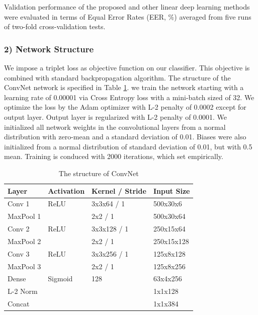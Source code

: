 \documentclass[runningheads]{llncs}
\begin{document}
Validation performance of the proposed and other linear deep learning methods were evaluated in terms of Equal Error Rates (EER, \%) averaged from five runs of two-fold cross-validation tests. 

\subsubsection{2) Network Structure}
 We impose a triplet loss as objective function on our classifier. This objective is combined with standard backpropagation algorithm.
 The structure of the ConvNet network is specified in Table \ref{tab1}. we train the network starting with a learning rate of 0.00001 via Cross Entropy loss with a mini-batch sized of 32. We optimize the loss by the Adam optimizer with L-2 penalty of 0.0002 except for output layer. Output layer is regularized with L-2 penalty of 0.0001.
 We initialized all network weights in the convolutional layers from a normal distribution with zero-mean and a standard deviation of 0.01. Biases were also initialized from a normal distribution of standard deviation of 0.01, but with 0.5 mean.
 Training is conduced with 2000 iterations, which set empirically.
 
 \begin{table}[]
    \caption{The structure of ConvNet}\label{tab1}
    \centering
    \begin{tabular}{|l|l|l|l|}
    \hline
    Layer     & Activation & Kernel / Stride & Input Size \\ \hline
    Conv 1    & ReLU       & 3x3x64 / 1      & 500x30x6   \\
    MaxPool 1 &            & 2x2 / 1         & 500x30x64  \\
    Conv 2    & ReLU       & 3x3x128 / 1     & 250x15x64 \\
    MaxPool 2 &            & 2x2 / 1         & 250x15x128 \\
    Conv 3    & ReLU       & 3x3x256 / 1     & 125x8x128  \\
    MaxPool 3 &            & 2x2 / 1         & 125x8x256  \\
    Dense     & Sigmoid    & 128             & 63x4x256   \\
    L-2 Norm  &            &                 & 1x1x128    \\
    Concat    &            &                 & 1x1x384    \\ \hline
    \end{tabular}
\end{table}
\end{document}

